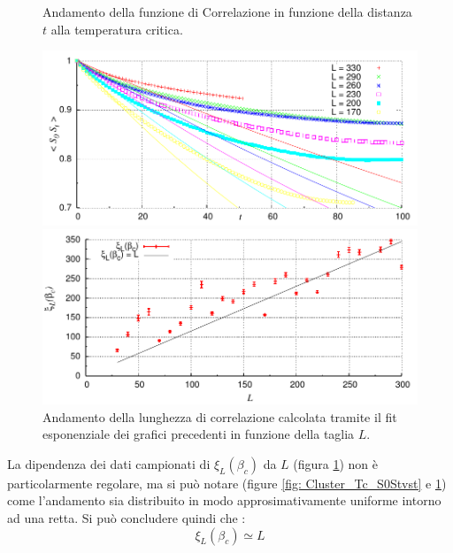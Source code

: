 \begin{figure}[htbp]
      \centering
      \caption[ParteC\_Tc\_StS0vst\_Cluster.cpp ]{Andamento della funzione di Correlazione in funzione della distanza $t$ alla temperatura critica.}\label{fig: Cluster_Tc_S0Stvst}
	\includegraphics[width=1\textwidth]{Immagini/ParteC/Cluster_Tc_S0Stvst}
	\bigskip
	  \caption[ParteC\_Tc\_StS0vst\_Cluster.cpp $\;\rightarrow\;$ grafico\_file.p ]{Andamento della lunghezza di correlazione calcolata tramite il fit esponenziale dei grafici precedenti in funzione della taglia $L$.}\label{fig: grafpo_Tc}
	\includegraphics[width=1\textwidth]{Immagini/ParteC/grafpo_Tc}
\end{figure}
La dipendenza dei dati campionati di $\xi_L(\beta_c)$ da $L$ (figura \ref{fig: grafpo_Tc}) non è particolarmente regolare, ma si può notare (figure \ref{fig: Cluster_Tc_S0Stvst} e \ref{fig: grafpo_Tc}) come l'andamento sia distribuito in modo approsimativamente uniforme intorno ad una retta.
Si può concludere quindi che :
$$\xi_L(\beta_c) \simeq L $$
